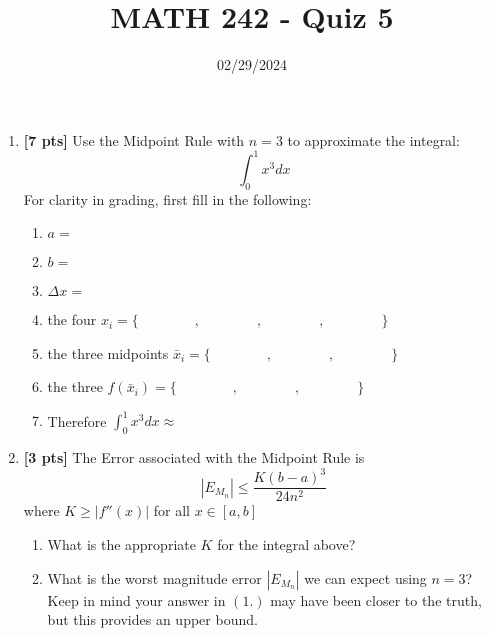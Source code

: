 \documentclass[12pt]{article}
\title{MATH 242 - Quiz 5}
\date{02/29/2024}
\begin{document}
\maketitle

\begin{enumerate}

\item \textbf{[7 pts]} Use the Midpoint Rule with $n=3$ to approximate the integral:
$$\int_0^1x^3dx$$
For clarity in grading, first fill in the following:
\begin{enumerate}
    \item $a=$
    \vfill
    \item $b=$
    \vfill
    \item $\Delta x=$
    \vfill
    \item the four $x_i=\{\qquad\qquad,\qquad\qquad,\qquad\qquad,\qquad\qquad\}$
    \vfill
    \item the three midpoints $\bar{x}_i=\{\qquad\qquad,\qquad\qquad,\qquad\qquad\}$
    \vfill
    \item the three $f(\bar{x}_i)=\{\qquad\qquad,\qquad\qquad,\qquad\qquad\}$
    \vfill
    \newpage
    \item Therefore $\int_0^1x^3dx\approx$
    \vfill
\end{enumerate}

\item \textbf{[3 pts]} The Error associated with the Midpoint Rule is
$$|E_{M_n}|\le\frac{K(b-a)^3}{24n^2}$$
where $K\ge|f''(x)|$ for all $x\in[a,b]$
\begin{enumerate}
    \item What is the appropriate $K$ for the integral above?
    \vfill
    \item What is the worst magnitude error $|E_{M_n}|$ we can expect using $n=3$? Keep in mind your answer in $(1.)$ may have been closer to the truth, but this provides an upper bound.
    \vfill
\end{enumerate}


\end{enumerate}
\end{document}
